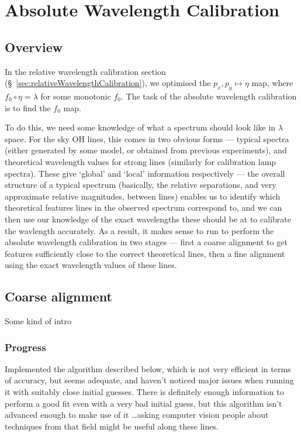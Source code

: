 \section{Absolute Wavelength Calibration}
\label{sec:absoluteWavelengthCalibration}

\subsection{Overview}

In the relative wavelength calibration section
(\S~\ref{sec:relativeWavelengthCalibration}), we optimised the $p_x, p_y
\mapsto \eta$ map, where $f_0 \circ \eta = \lambda$ for some monotonic
$f_0$. The task of the absolute wavelength calibration is to find the
$f_0$ map.

To do this, we need some knowledge of what a spectrum should look like
in $\lambda$ space. For the sky OH lines, this comes in two obvious
forms --- typical spectra (either generated by some model, or obtained
from previous experiments), and theoretical wavelength values for
strong lines (similarly for calibration lamp spectra). These give
`global' and `local' information respectively --- the overall structure
of a typical spectrum (basically, the relative separations, and very
approximate relative magnitudes, between lines) enables us to identify
which theoretical features lines in the observed spectrum correspond
to, and we can then use our knowledge of the exact wavelengths these
should be at to calibrate the wavlength accurately. As a result, it
makes sense to run to perform the absolute wavelength calibration in two
stages --- first a coarse alignment to get features sufficiently close
to the correct theoretical lines, then a fine alignment using the exact
wavelength values of these lines.


\subsection{Coarse alignment}

Some kind of intro

\subsubsection{Progress}

Implemented the algorithm described below, which is not very efficient in terms
of accuracy, but seems adequate, and haven't noticed major issues when running
it with suitably close initial guesses. There is definitely enough information
to perform a good fit even with a very bad initial guess, but this algorithm
isn't advanced enough to make use of it \dots asking computer vision people
about techniques from that field might be useful along these lines.

